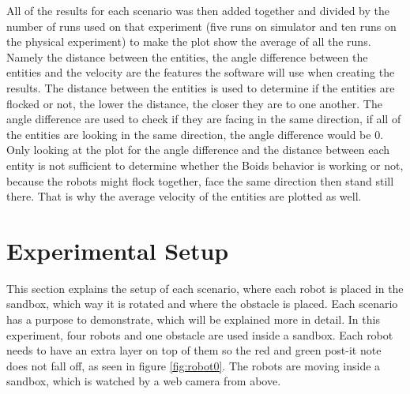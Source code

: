 All of the results for each scenario was then added together and divided by the number of runs used on that experiment (five runs on simulator and ten runs on the physical experiment) to make the plot show the average of all the runs.
Namely the distance between the entities, the angle difference between the entities and the velocity are the features the software will use when creating the results.
The distance between the entities is used to determine if the entities are flocked or not, the lower the distance, the closer they are to one another.
The angle difference are used to check if they are facing in the same direction, if all of the entities are looking in the same direction, the angle difference would be 0.
Only looking at the plot for the angle difference and the distance between each entity is not sufficient to determine whether the Boids behavior is working or not, because the robots might flock together, face the same direction then stand still there. That is why the average velocity of the entities are plotted as well.



\section{Experimental Setup}
\label{sec:experimentalSetup}
This section explains the setup of each scenario, where each robot is placed in the sandbox, which way it is rotated and where the obstacle is placed. Each scenario has a purpose to demonstrate, which will be explained more in detail.
In this experiment, four robots and one obstacle are used inside a sandbox. Each robot needs to have an extra layer on top of them so the red and green post-it note does not fall off, as seen in figure \ref{fig:robot0}. The robots are moving inside a sandbox, which is watched by a web camera from above.

